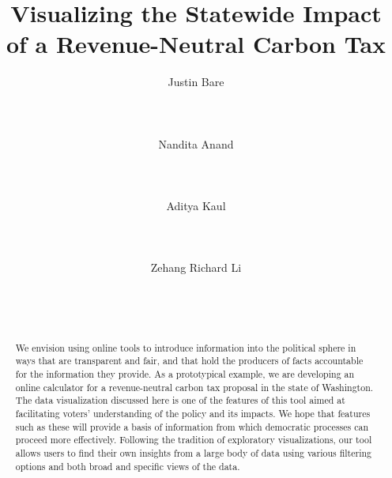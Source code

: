 \documentclass{sigchi}
\begin{document}
\title{Visualizing the Statewide Impact of a Revenue-Neutral Carbon Tax}

\author{
  \alignauthor Justin Bare\\
    \\
    \\
    \\
    \affaddr{}
  \alignauthor Nandita Anand\\
      \\
      \\
      \\
      \affaddr{}
  \alignauthor Aditya Kaul\\
      \\
      \\
      \\
      \affaddr{}
  \alignauthor Zehang Richard Li\\
      \\
      \\
      \\
      \affaddr{}
}

\maketitle

\begin{abstract}
We envision using online tools to introduce information into the political sphere in ways that are transparent and fair, and that hold the producers of facts accountable for the information they provide. As a prototypical example, we are developing an online calculator for a revenue-neutral carbon tax proposal in the state of Washington. The data visualization discussed here is one of the features of this tool aimed at facilitating voters' understanding of the policy and its impacts. We hope that features such as these will provide a basis of information from which democratic processes can proceed more effectively. Following the tradition of exploratory visualizations, our tool allows users to find their own insights from a large body of data using various filtering options and both broad and specific views of the data. 

\end{abstract}
\end{document}
